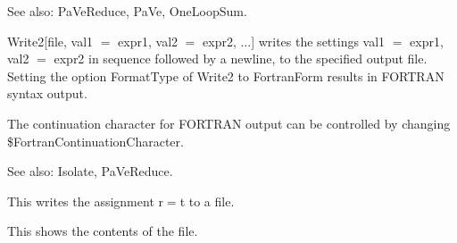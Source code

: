 See also: { }PaVeReduce, PaVe, OneLoopSum.



Write2[file, val1 \(=\) expr1, val2 \(=\) expr2, ...] writes the settings val1 \(=\) expr1, val2 \(=\) expr2 in sequence followed by a
  newline, to the specified output file. Setting the option FormatType of Write2 to FortranForm results in FORTRAN syntax output.

The continuation character for FORTRAN output can be controlled by changing \${}FortranContinuationCharacter.







See also:  Isolate, PaVeReduce.





This writes the assignment r\(=\)t to a file.


This shows the contents of the file.





